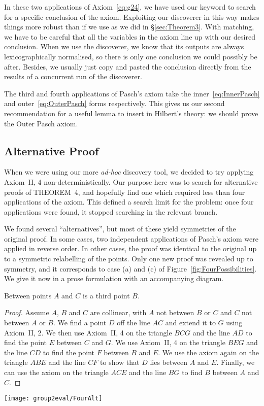 In these two applications of Axiom~\ref{eq:g24}, we have used our  keyword to search for a specific conclusion of the axiom. Exploiting our discoverer in this way makes things more robust than if we use  as we did in \S\ref{sec:Theorem3}. With matching, we have to be careful that all the variables in the axiom line up with our desired conclusion. When we use the discoverer, we know that its outputs are always lexicographically normalised, so there is only one conclusion we could possibly be after. Besides, we usually just copy and pasted the conclusion directly from the results of a concurrent run of the discoverer.

The third and fourth applications of Pasch's axiom take the inner~\eqref{eq:InnerPasch} and outer~\eqref{eq:OuterPasch} forms respectively. This gives us our second recommendation for a useful lemma to insert in Hilbert's theory: we should prove the Outer Pasch axiom.

\subsection{Alternative Proof}\label{sec:FourAlternative}
When we were using our more \emph{ad-hoc} discovery tool, we decided to try applying Axiom~II, 4 non-deterministically. Our purpose here was to search for alternative proofs of THEOREM~4, and hopefully find one which required less than four applications of the axiom. This defined a search limit for the problem: once four applications were found, it stopped searching in the relevant branch. 

We found several ``alternatives'', but most of these yield symmetries of the original proof. In some cases, two independent applications of Pasch's axiom were applied in reverse order. In other cases, the proof was identical to the original up to a symmetric relabelling of the points. Only one new proof was revealed up to symmetry, and it corresponds to case (a) and (c) of Figure~\ref{fig:FourPossibilities}. We give it now in a prose formulation with an accompanying diagram.

\begin{proposition}
Between points $A$ and $C$ is a third point $B$.
\end{proposition}
\begin{proof}Assume $A$, $B$ and $C$ are collinear, with $A$ not between $B$ or $C$ and $C$ not between $A$ or $B$. We find a point $D$ off the line $AC$ and extend it to $G$ using Axiom~II, 2. We then use Axiom~II, 4 on the triangle $BCG$ and the line $AD$ to find the point $E$ between $C$ and $G$. We use Axiom~II, 4 on the triangle $BEG$ and the line $CD$ to find the point $F$ between $B$ and $E$. We use the axiom again on the triangle $ABE$ and the line $CF$ to show that $D$ lies between $A$ and $E$. Finally, we can use the axiom on the triangle $ACE$ and the line $BG$ to find $B$ between $A$ and $C$.
\end{proof}
\begin{center}\texttt{[image: group2eval/FourAlt]}
\end{center}

